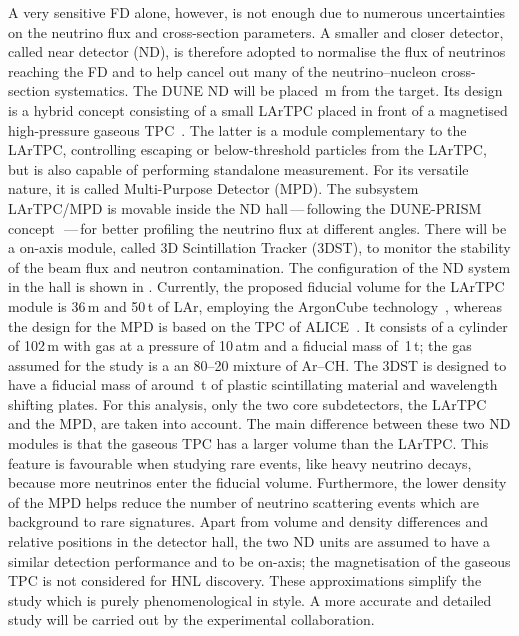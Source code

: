 A very sensitive FD alone, however, is not enough due to numerous uncertainties on the neutrino flux and cross-section parameters.
A smaller and closer detector, called near detector (ND), is therefore adopted to normalise %
the flux of neutrinos reaching the FD and to help cancel out many of the neutrino--nucleon cross-section systematics.
The DUNE ND will be placed \,m from the target.
Its design is a hybrid concept consisting of a small LArTPC placed in front of a magnetised high-pressure gaseous TPC~\cite{Abi:2020wmh}.
The latter is a module complementary to the LArTPC, controlling escaping or below-threshold particles from the LArTPC, %
but is also capable of performing standalone measurement.
For its versatile nature, it is called Multi-Purpose Detector (MPD).
The subsystem LArTPC/MPD is movable inside the ND hall\,---\,following the DUNE-PRISM concept~\cite{Abi:2020wmh}\,---\,for %
better profiling the neutrino flux at different angles.
There will be a on-axis module, called 3D Scintillation Tracker (3DST), to monitor %
the stability of the beam flux and neutron contamination.
The configuration of the ND system in the hall is shown in .
Currently, the proposed fiducial volume for the LArTPC module is 36\,m and 50\,t of LAr, %
employing the ArgonCube technology~\cite{Asaadi:2018xfh}, %
whereas the design for the MPD is based on the TPC of \mbox{ALICE}~\cite{Glassel:2004jv}.
It consists of a cylinder of 102\,m with gas at a pressure of 10\,atm and a fiducial mass of~1\,t; %
the gas assumed for the study is a an 80--20 mixture of Ar--CH.
The 3DST is designed to have a fiducial mass of around \,t of plastic scintillating material and %
wavelength shifting plates.
For this analysis, only the two core subdetectors, the LArTPC and the MPD, are taken into account.
The main difference between these two ND modules is that the gaseous TPC has a larger volume than the LArTPC.
This feature is favourable when studying rare events, like heavy neutrino decays, because more neutrinos enter the fiducial volume.
Furthermore, the lower density of the MPD helps reduce the number of neutrino scattering events which are background to rare signatures.
Apart from volume and density differences and relative positions in the detector hall, %
the two ND units are assumed to have a similar detection performance and to be on-axis; %
the magnetisation of the gaseous TPC is not considered for HNL discovery.
These approximations simplify the study which is purely phenomenological in style.
A more accurate and detailed study will be carried out by the experimental collaboration. 

